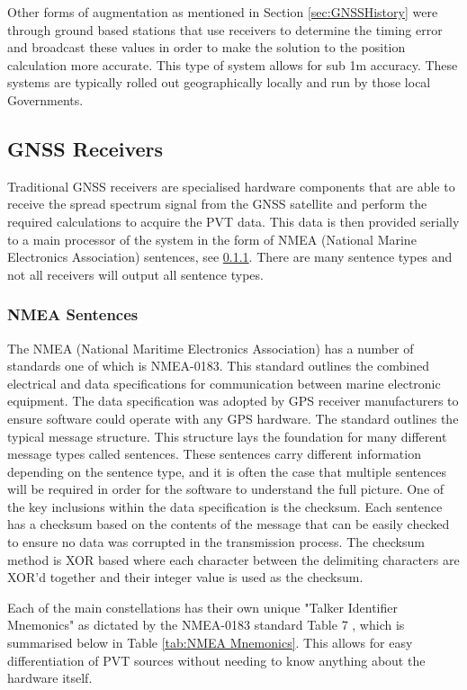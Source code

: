 Other forms of augmentation as mentioned in Section \ref{sec:GNSSHistory} were through ground based stations that use receivers to determine the timing error and broadcast these
values in order to make the solution to the position calculation more accurate. This type of system allows for sub 1m accuracy. These systems are typically rolled out
geographically locally and run by those local Governments.

\subsection{GNSS Receivers}
Traditional GNSS receivers are specialised hardware components that are able to receive the spread spectrum signal from the GNSS satellite and perform the required
calculations to acquire the PVT data. This data is then provided serially to a main processor of the system in the form of NMEA (National Marine Electronics Association)
sentences, see \ref{subsubsec:NMEA}. There are many sentence types
and not all receivers will output all sentence types.

\subsubsection{NMEA Sentences} \label{subsubsec:NMEA}
The NMEA (National Maritime Electronics Association) has a number of standards one of which is NMEA-0183. This standard outlines the combined electrical and data
specifications for communication between marine electronic equipment. The data specification was adopted by GPS receiver manufacturers to ensure software could operate
with any GPS hardware. The standard outlines the typical message structure. This structure lays the foundation for many different message types called sentences. These
sentences carry different information depending on the sentence type, and it is often the case that multiple sentences will be required in order for the software to
understand the full picture. One of the key inclusions within the data specification is the checksum. Each sentence has a checksum based on the contents of the message
that can be easily checked to ensure no data was corrupted in the transmission process. The checksum method is XOR based where each character between the delimiting
characters are XOR'd together and their integer value is used as the checksum.

Each of the main constellations has their own unique "Talker Identifier Mnemonics" as dictated by the NMEA-0183 standard Table 7 , which is summarised
below in Table \ref{tab:NMEA Mnemonics}. This allows for easy differentiation of PVT sources without needing to know anything about the hardware itself.


